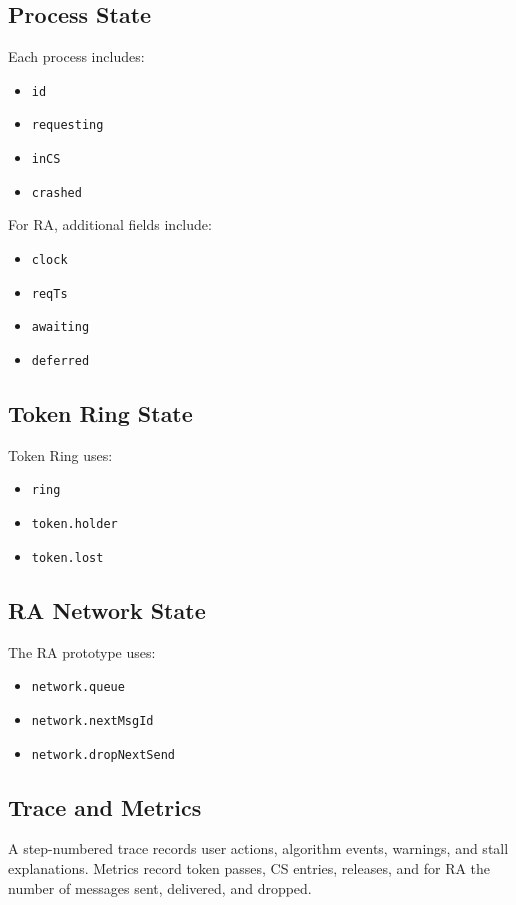 \subsection{Process State}
Each process includes:
\begin{itemize}
  \item \texttt{id}
  \item \texttt{requesting}
  \item \texttt{inCS}
  \item \texttt{crashed}
\end{itemize}

For RA, additional fields include:
\begin{itemize}
  \item \texttt{clock}
  \item \texttt{reqTs}
  \item \texttt{awaiting}
  \item \texttt{deferred}
\end{itemize}

\subsection{Token Ring State}
Token Ring uses:
\begin{itemize}
  \item \texttt{ring}
  \item \texttt{token.holder}
  \item \texttt{token.lost}
\end{itemize}

\subsection{RA Network State}
The RA prototype uses:
\begin{itemize}
  \item \texttt{network.queue}
  \item \texttt{network.nextMsgId}
  \item \texttt{network.dropNextSend}
\end{itemize}

\subsection{Trace and Metrics}
A step-numbered trace records user actions, algorithm events, warnings, and stall explanations. Metrics record token passes, CS entries, releases, and for RA the number of messages sent, delivered, and dropped.


